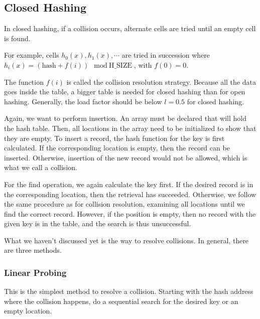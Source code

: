 \subsection{Closed Hashing}
In closed hashing, if a collision occurs, alternate cells are tried until an empty cell is found.

For example, cells \(h_0(x), h_1(x), \cdots\) are tried in succession where \(h_i(x) = (\text{hash} + f(i)) \mod \text{H\_SIZE}\), with \(f(0) = 0\).

The function \(f(i)\) is called the collision resolution strategy. Because all the data goes inside the table, a bigger table is needed for closed hashing than for open hashing. Generally, the load factor should be below \(l = 0.5\) for closed hashing.

Again, we want to perform insertion. An array must be declared that will hold the hash table. Then, all locations in the array need to be initialized to show that they are empty. To insert a record, the hash function for the key is first calculated. If the corresponding location is empty, then the record can be inserted. Otherwise, insertion of the new record would not be allowed, which is what we call a collision.

For the find operation, we again calculate the key first. If the desired record is in the corresponding location, then the retrieval has succeeded. Otherwise, we follow the same procedure as for collision resolution, examining all locations until we find the correct record. However, if the position is empty, then no record with the given key is in the table, and the search is thus unsuccessful.

What we haven't discussed yet is the way to resolve collisions. In general, there are three methods.

\subsubsection{Linear Probing}
This is the simplest method to resolve a collision. Starting with the hash address where the collision happens, do a sequential search for the desired key or an empty location. 

